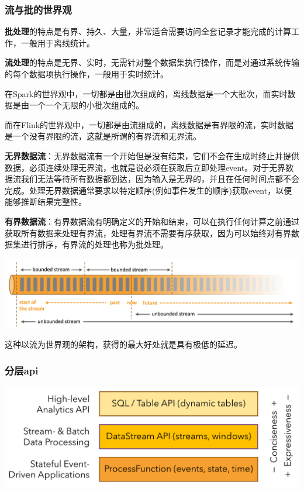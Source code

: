 \documentclass{ctexart}
\begin{document}
\subsubsection{流与批的世界观}

\textbf{批处理}的特点是有界、持久、大量，非常适合需要访问全套记录才能完成的计算工作，一般用于离线统计。

\textbf{流处理}的特点是无界、实时，无需针对整个数据集执行操作，而是对通过系统传输的每个数据项执行操作，一般用于实时统计。

在Spark的世界观中，一切都是由批次组成的，离线数据是一个大批次，而实时数据是由一个一个无限的小批次组成的。

而在Flink的世界观中，一切都是由流组成的，离线数据是有界限的流，实时数据是一个没有界限的流，这就是所谓的有界流和无界流。

\textbf{无界数据流}：无界数据流有一个开始但是没有结束，它们不会在生成时终止并提供数据，必须连续处理无界流，也就是说必须在获取后立即处理event。对于无界数据流我们无法等待所有数据都到达，因为输入是无界的，并且在任何时间点都不会完成。处理无界数据通常要求以特定顺序(例如事件发生的顺序)获取event，以便能够推断结果完整性。

\textbf{有界数据流}：有界数据流有明确定义的开始和结束，可以在执行任何计算之前通过获取所有数据来处理有界流，处理有界流不需要有序获取，因为可以始终对有界数据集进行排序，有界流的处理也称为批处理。

\includegraphics[width=\textwidth]{bounded-unbounded.png}

这种以流为世界观的架构，获得的最大好处就是具有极低的延迟。

\subsubsection{分层api}

\includegraphics[width=\textwidth]{api-stack.png}
\end{document}
